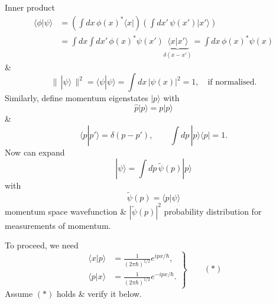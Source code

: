 \documentclass[11pt,a4paper]{article}
\begin{document}
Inner product
\begin{align*}
    \langle\phi|\psi\rangle
    &=\left(\int dx\,\phi(x)^*\langle x|\right)
      \left(\int dx'\,\psi(x')|x'\rangle\right)\\
    &=\int dx\int dx'\,\phi(x)^*\psi(x')
      \underbrace{\langle x|x'\rangle}_{\delta(x-x')}
      =\int dx\,\phi(x)^*\psi(x)
\end{align*}
\&
\[
    \bigl\|\,|\psi\rangle\,\bigr\|^2
    =\langle\psi|\psi\rangle=\int dx\,|\psi(x)|^2=1,
    \quad\text{if normalised}.
\]
Similarly, define momentum eigenstates $|p\rangle$ with
\[
    \hat{p}|p\rangle=p|p\rangle
\]
\&
\[
    \langle p|p'\rangle=\delta(p-p'),
    \qquad \int dp\,|p\rangle\langle p|=1.
\]
Now can expand
\[
    |\psi\rangle=\int dp\,\tilde{\psi}(p)|p\rangle
\]
with
\[
    \tilde{\psi}(p)=\langle p|\psi\rangle
\]
momentum space wavefunction \& $|\tilde{\psi}(p)|^2$ probability distribution
for measurements of momentum.

To proceed, we need
\[
    \left.
    \begin{aligned}
        \langle x|p\rangle&=\frac{1}{(2\pi\hbar)^{1/2}}e^{ipx/\hbar},\\
        \langle p|x\rangle&=\frac{1}{(2\pi\hbar)^{1/2}}e^{-ipx/\hbar}.
    \end{aligned}
    \right\}\qquad (*)
\]
Assume $(*)$ holds \& verify it below.
\end{document}
